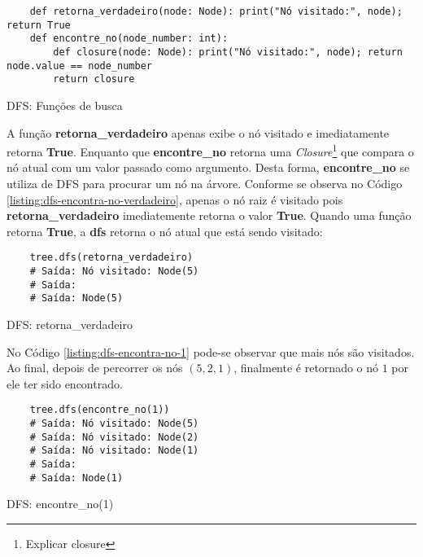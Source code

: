 \begin{listing}[H]
    \begin{verbatim}
    def retorna_verdadeiro(node: Node): print("Nó visitado:", node); return True
    def encontre_no(node_number: int):
        def closure(node: Node): print("Nó visitado:", node); return node.value == node_number
        return closure
    \end{verbatim}
    \caption{DFS: Funções de busca}
    \label{listing:dfs-encontra-no-funcoes}
\end{listing}
A função \textbf{retorna\_verdadeiro} apenas exibe o nó visitado e imediatamente retorna \textbf{True}. Enquanto que \textbf{encontre\_no}
retorna uma \textit{Closure}\footnote{
    Explicar closure
}
que compara o nó atual com um valor passado como argumento. Desta forma, \textbf{encontre\_no} se utiliza de DFS para procurar um nó na árvore.\linebreak
Conforme se observa no Código \ref{listing:dfs-encontra-no-verdadeiro}, apenas o nó raiz é visitado pois \textbf{retorna\_verdadeiro} imediatemente retorna
o valor \textbf{True}. Quando uma função retorna \textbf{True}, a \textbf{dfs} retorna o nó atual que está sendo visitado:

\begin{listing}[H]
    \begin{verbatim}
    tree.dfs(retorna_verdadeiro)
    # Saída: Nó visitado: Node(5)
    # Saída: 
    # Saída: Node(5)
    \end{verbatim}
    \caption{DFS: retorna\_verdadeiro}
    \label{listing:dfs-encontra-no-verdadeiro}
\end{listing}

No Código \ref{listing:dfs-encontra-no-1} pode-se observar que mais nós são visitados. Ao final, depois de percorrer
os nós $(5,2,1)$, finalmente é retornado o nó $1$ por ele ter sido encontrado.

\begin{listing}[H]
    \begin{verbatim}
    tree.dfs(encontre_no(1))
    # Saída: Nó visitado: Node(5)
    # Saída: Nó visitado: Node(2)
    # Saída: Nó visitado: Node(1)
    # Saída: 
    # Saída: Node(1)
    \end{verbatim}
    \caption{DFS: encontre\_no(1)}
    \label{listing:dfs-encontra-no-1}
\end{listing}

